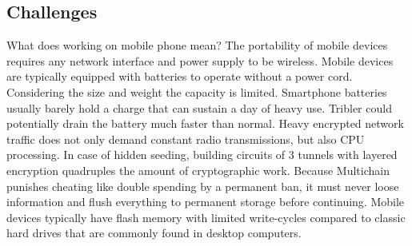 \subsection{Challenges}
What does working on mobile phone mean?
The portability of mobile devices requires any network interface and power supply to be wireless.
Mobile devices are typically equipped with batteries to operate without a power cord.
Considering the size and weight the capacity is limited.
Smartphone batteries usually barely hold a charge that can sustain a day of heavy use.
Tribler could potentially drain the battery much faster than normal.
Heavy encrypted network traffic does not only demand constant radio transmissions, but also CPU processing.
In case of hidden seeding, building circuits of 3 tunnels with layered encryption quadruples  the amount of cryptographic work.
Because Multichain punishes cheating like double spending by a permanent ban, it must never loose information and flush everything to permanent storage before continuing.
Mobile devices typically have flash memory with limited write-cycles compared to classic hard drives that are commonly found in desktop computers.

